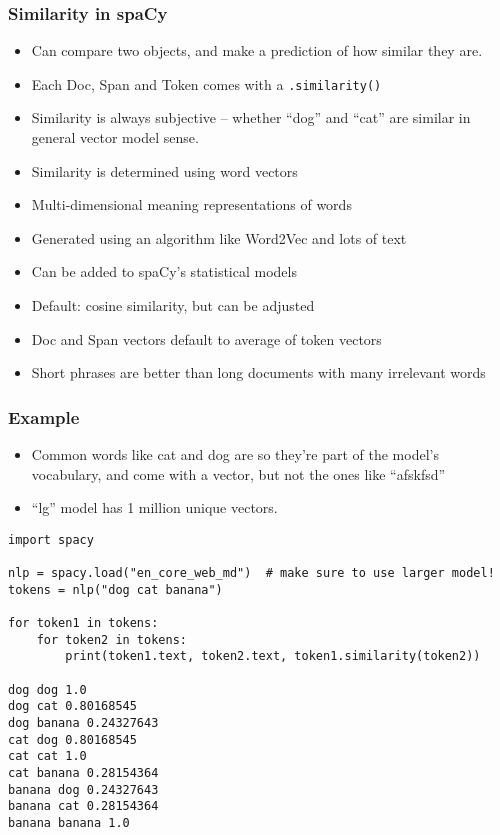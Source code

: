 \begin{frame}[fragile]\frametitle{Similarity in spaCy}

\begin{itemize}
\item Can compare two objects, and make a prediction of how similar they are. 
\item Each Doc, Span and Token comes with a \lstinline|.similarity()|
\item Similarity is always subjective – whether “dog” and “cat” are similar in general vector model sense.
\item Similarity is determined using word vectors
\item Multi-dimensional meaning representations of words
\item Generated using an algorithm like Word2Vec and lots of text
\item Can be added to spaCy's statistical models
\item Default: cosine similarity, but can be adjusted
\item Doc and Span vectors default to average of token vectors
\item Short phrases are better than long documents with many irrelevant words
\end{itemize}
\end{frame}
\begin{frame}[fragile]\frametitle{Example}

\begin{itemize}
\item Common words like cat and dog are so they’re part of the model’s vocabulary, and come with a vector, but not the ones like ``afskfsd''
\item ``lg'' model has 1 million unique vectors.
\end{itemize}


\begin{lstlisting}
import spacy

nlp = spacy.load("en_core_web_md")  # make sure to use larger model!
tokens = nlp("dog cat banana")

for token1 in tokens:
    for token2 in tokens:
        print(token1.text, token2.text, token1.similarity(token2))
		
dog dog 1.0
dog cat 0.80168545
dog banana 0.24327643
cat dog 0.80168545
cat cat 1.0
cat banana 0.28154364
banana dog 0.24327643
banana cat 0.28154364
banana banana 1.0
\end{lstlisting}


\end{frame}

